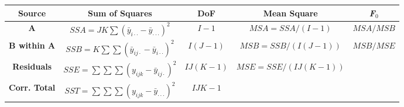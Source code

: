 \documentclass[12pt]{article}
\begin{document}
\pagestyle{empty}
\large
{}
\pagecolor{ehandbook}


\hspace*{-1.75in}
\begin{tabular}{|c|c|c|c|c|} \hline 
{\bf Source}  & {\bf Sum of Squares} & {\bf DoF} & {\bf Mean Square} & {\bf \it{F}$_0$} \\ \hline
{\bf A}    & $SSA = JK\sum{{(\bar{y}_{i \cdot\cdot}-\bar{y}_{\cdot\cdot\cdot})}^2}$ & $I-1$ & $MSA = SSA/(I-1)$ & $MSA/MSB$ \\ \hline
{\bf B within A} & $SSB = K\sum \sum{{(\bar{y}_{ij\cdot} - \bar{y}_{i\cdot\cdot})}}^2$ & $I(J-1)$ & $MSB = SSB/(I(J-1))$  & $MSB/MSE$\\ \hline
{\bf Residuals} & $SSE = \sum \sum \sum{{(y_{ijk} - \bar{y}_{ij\cdot})^2}}$  & $IJ(K-1)$ & $MSE = SSE/(IJ(K-1))$  & \\ \hline
{\bf Corr. Total} & $SST = \sum \sum \sum{{(y_{ijk} - \bar{y}_{\cdot\cdot\cdot})^2}} $ & $IJK-1$ &  &\\ \hline
\end{tabular}
\end{document}

